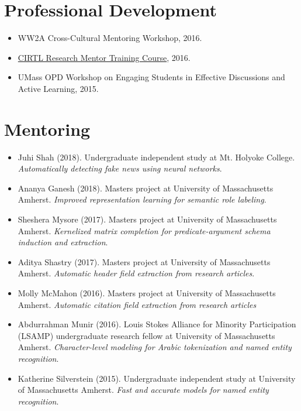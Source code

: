 \documentclass{resume}
\begin{document}
\section{Professional Development}
\begin{itemize}
\item WW2A Cross-Cultural Mentoring Workshop, 2016.
\item \href{https://www.cirtl.net/courses/261}{CIRTL Research Mentor Training Course}, 2016.
\item UMass OPD Workshop on Engaging Students in Effective Discussions and Active Learning, 2015.
\end{itemize}

\section{Mentoring}
\begin{itemize}
\item Juhi Shah (2018). Undergraduate independent study at Mt. Holyoke College. \emph{Automatically detecting fake news using neural networks}.
\item Ananya Ganesh (2018). Masters project at University of Massachusetts Amherst. \emph{Improved representation learning for semantic role labeling}.
\item Sheshera Mysore (2017). Masters project at University of Massachusetts Amherst. \emph{Kernelized matrix completion for predicate-argument schema induction and extraction}.
\item Aditya Shastry (2017). Masters project at University of Massachusetts Amherst. \emph{Automatic header field extraction from research articles}.
\item Molly McMahon (2016). Masters project at University of Massachusetts Amherst. \emph{Automatic citation field extraction from research articles}
\item Abdurrahman Munir (2016). Louis Stokes Alliance for Minority Participation (LSAMP) undergraduate research fellow at University of Massachusetts Amherst. \emph{Character-level modeling for Arabic tokenization and named entity recognition}.
\item Katherine Silverstein (2015). Undergraduate independent study at University of Massachusetts Amherst. \emph{Fast and accurate models for named entity recognition}.
\end{itemize}
\end{document}
